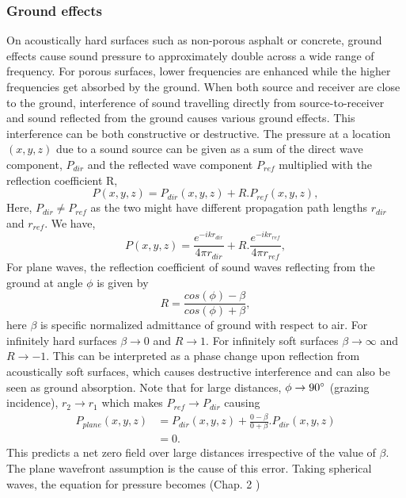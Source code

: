 \subsubsection{Ground effects}\label{sec:ground}
On acoustically hard surfaces such as non-porous asphalt or concrete, ground effects cause sound pressure to approximately double across a wide range of frequency. For porous surfaces, lower frequencies are enhanced while the higher frequencies get absorbed by the ground. When both source and receiver are close to the ground, interference of sound travelling directly from  source-to-receiver and sound reflected from the ground causes various ground effects. This interference can be both constructive or destructive. The pressure at a location $(x,y,z)$ due to a sound source can be given as a sum of the direct wave component, $P_{dir}$ and the reflected wave component $P_{ref}$ multiplied with the reflection coefficient R,
\begin{equation}
    P(x,y,z)=P_{dir}(x,y,z)+R.P_{ref}(x,y,z),    
\end{equation}
Here, $P_{dir} \neq P_{ref}$ as the two might have different propagation path lengths $r_ {dir}$ and $r_{ref}$. We have,
\begin{equation}
    P(x,y,z)=\frac{e^{-ikr_{dir}}}{4\pi r_{dir}} + R.\frac{e^{-ikr_{ref}}}{4\pi r_{ref}},
\end{equation}
For plane waves, the reflection coefficient of sound waves reflecting from the ground at angle $\phi$ is given by
\begin{equation}
    R = \frac{cos (\phi) - \beta}{cos (\phi) + \beta},
\end{equation}
here $\beta$ is specific normalized admittance of ground with respect to air. For infinitely hard surfaces $\beta \to 0$ and $R \to 1$. For infinitely soft surfaces  $\beta \to \infty$ and $R \to -1$. This can be interpreted as a phase change upon reflection from acoustically soft surfaces, which causes destructive interference and can also be seen as ground absorption. Note that for large distances, $\phi \to 90\degree$ (grazing incidence),  $r_2 \to r_1$ which makes $P_{ref} \to P_{dir}$ causing
\begin{equation}
\begin{split}
    P_{plane}(x,y,z)&=P_{dir}(x,y,z)+ \frac{0-\beta}{0+\beta}.P_{dir}(x,y,z)\\
            &=0.
\end{split}
\end{equation}
This predicts a net zero field over large distances irrespective of the value of $\beta$. The plane wavefront assumption is the cause of this error. Taking spherical waves, the equation for pressure becomes (Chap. 2 \cite{attenborough2006predicting})
